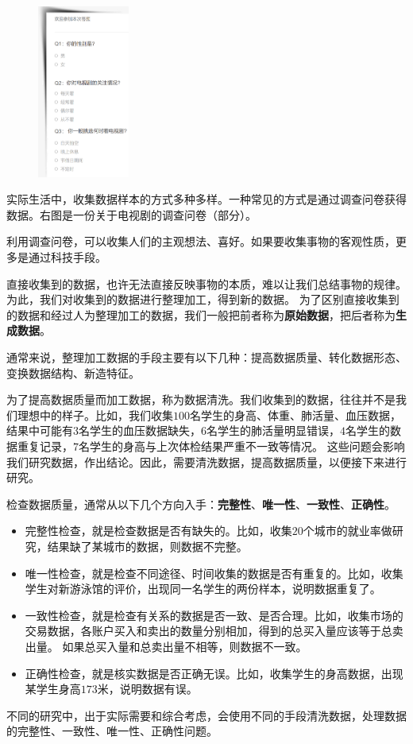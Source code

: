 \documentclass[12pt,UTF8]{ctexbook}
\begin{document}
\begin{figure} %
    \vspace{-20pt}
    \flushright
    \includegraphics[width=0.27\textwidth]{问卷调查2.png}
\end{figure}

实际生活中，收集数据样本的方式多种多样。一种常见的方式是通过调查问卷获得数据。右图是一份关于电视剧的调查问卷（部分）。

利用调查问卷，可以收集人们的主观想法、喜好。如果要收集事物的客观性质，更多是通过科技手段。

直接收集到的数据，也许无法直接反映事物的本质，难以让我们总结事物的规律。
为此，我们对收集到的数据进行整理加工，得到新的数据。
为了区别直接收集到的数据和经过人为整理加工的数据，我们一般把前者称为\textbf{原始数据}，把后者称为\textbf{生成数据}。

通常来说，整理加工数据的手段主要有以下几种：提高数据质量、转化数据形态、变换数据结构、新造特征。

为了提高数据质量而加工数据，称为数据清洗。我们收集到的数据，往往并不是我们理想中的样子。比如，我们收集$100$名学生的身高、体重、肺活量、血压数据，
结果中可能有$3$名学生的血压数据缺失，$6$名学生的肺活量明显错误，$4$名学生的数据重复记录，$7$名学生的身高与上次体检结果严重不一致等情况。
这些问题会影响我们研究数据，作出结论。因此，需要清洗数据，提高数据质量，以便接下来进行研究。

检查数据质量，通常从以下几个方向入手：\textbf{完整性}、\textbf{唯一性}、\textbf{一致性}、\textbf{正确性}。
\begin{itemize}
    \item 完整性检查，就是检查数据是否有缺失的。比如，收集$20$个城市的就业率做研究，结果缺了某城市的数据，则数据不完整。
    \item 唯一性检查，就是检查不同途径、时间收集的数据是否有重复的。比如，收集学生对新游泳馆的评价，出现同一名学生的两份样本，说明数据重复了。
    \item 一致性检查，就是检查有关系的数据是否一致、是否合理。比如，收集市场的交易数据，各账户买入和卖出的数量分别相加，得到的总买入量应该等于总卖出量。
    如果总买入量和总卖出量不相等，则数据不一致。
    \item 正确性检查，就是核实数据是否正确无误。比如，收集学生的身高数据，出现某学生身高$173$米，说明数据有误。
\end{itemize}
不同的研究中，出于实际需要和综合考虑，会使用不同的手段清洗数据，处理数据的完整性、一致性、唯一性、正确性问题。
\end{document}
